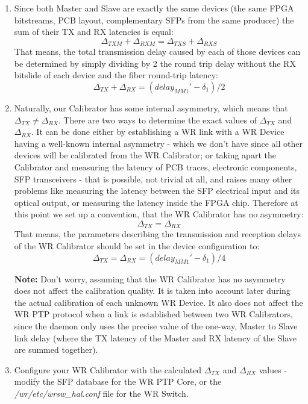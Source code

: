 \begin{enumerate}
	\item Since both Master and Slave are exactly the same devices (the same FPGA
		bitstreams, PCB layout, complementary SFPs from the same producer) the sum
		of their TX and RX latencies is equal:
		\begin{equation} 
			\Delta_{TXM} + \Delta_{RXM} = \Delta_{TXS} + \Delta_{RXS} 
		\end{equation}
		That means, the total transmission delay caused by each of those devices can
		be determined by simply dividing by 2 the round trip delay without the RX
		bitslide of each device and the fiber round-trip latency:
		\begin{equation}
			\Delta_{TX} + \Delta_{RX} = (delay_{MM1}' - \delta_1) /
			2
		\end{equation}
	\item Naturally, our Calibrator has some internal asymmetry, which means that
		$\Delta_{TX} \neq \Delta_{RX}$. There are two ways to determine the exact
		values of $\Delta_{TX}$ and $\Delta_{RX}$. It can be done either by
		establishing a WR link with a WR Device having a well-known internal
		asymmetry - which we don't have since all other devices will be calibrated
		from the WR Calibrator; or taking apart the Calibrator and measuring the
		latency of PCB traces, electronic components, SFP transceivers - that is
		possible, not trivial at all, and raises many other problems like measuring
		the latency between the SFP electrical input and its optical output, or
		measuring the latency inside the FPGA chip. Therefore at this point we set
		up a convention, that the WR Calibrator has no asymmetry:
		\begin{equation}
			\Delta_{TX} = \Delta_{RX}
		\end{equation}
		That means, the parameters describing the transmission and reception delays
		of the WR Calibrator should be set in the device configuration to:
		\begin{equation}
			\Delta_{TX} = \Delta_{RX} = (delay_{MM1}' - \delta_1) /
			4
		\end{equation}

		{\bf Note:} Don't worry, assuming that the WR Calibrator has no asymmetry
    does not affect the calibration quality. It is taken into account later
    during the actual calibration of each unknown WR Device. It also does not
    affect the WR PTP protocol when a link is established between two WR
    Calibrators, since the daemon only uses the precise value of the one-way,
    Master to Slave link delay (where the TX latency of the Master and RX
    latency of the Slave are summed together).
		
	\item Configure your WR Calibrator with the calculated $\Delta_{TX}$ and
		$\Delta_{RX}$ values - modify the SFP database for the WR PTP Core, or the
		\emph{/wr/etc/wrsw\_hal.conf} file for the WR Switch.
\end{enumerate}


